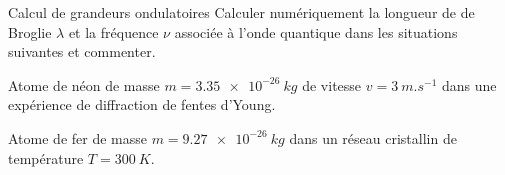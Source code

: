 \begin{exo}[PC][1][appli]{Calcul de grandeurs ondulatoires}
  \hauteurLargeurCadreReponse		{8mm}{7cm}
Calculer numériquement la longueur de de Broglie $\lambda$ et la fréquence $\nu$ associée à l’onde quantique dans les situations suivantes et commenter.

  \begin{enonce}
  	Atome de néon de masse $m=\SI{3.35e-26}{kg}$ de vitesse $v=\SI{3}{m.s^{-1}}$ dans une expérience de diffraction de fentes d'Young.\\

  \end{enonce}


  \begin{corrige}

  \end{corrige}
  
  \begin{enonce}
    Atome de fer de masse $m=\SI{9.27e-26}{kg}$ dans un réseau cristallin de température $T=\SI{300}{K}$.\\ 

  \end{enonce}

\end{exo}

